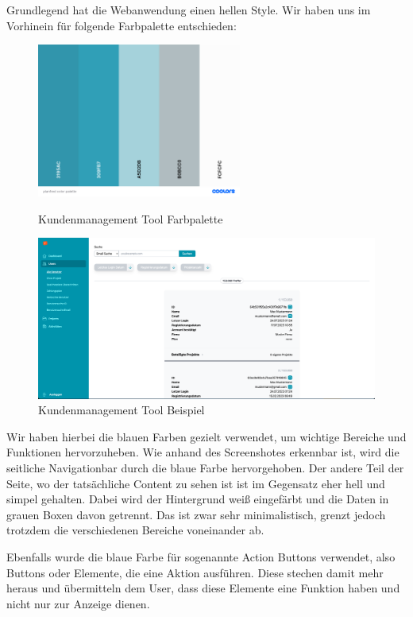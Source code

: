 Grundlegend hat die Webanwendung einen hellen Style. Wir haben uns im Vorhinein für folgende Farbpalette entschieden:

\begin{figure}[h!]
    \centering
    \includegraphics[width=0.6\textwidth]{pics/planfred-color-palette.png}
    \caption{Kundenmanagement Tool Farbpalette}
    \cite{frontend_design_colors}
    \label{fig:mesh1}
\end{figure}
\newpage
\begin{figure}[h!]
    \centering
    \includegraphics[width=1\textwidth]{pics/planfred-ui-ux-example.png}
    \caption{Kundenmanagement Tool Beispiel}
    \label{fig:mesh1}
\end{figure}

Wir haben hierbei die blauen Farben gezielt verwendet, um wichtige Bereiche und Funktionen hervorzuheben. Wie anhand des Screenshotes erkennbar ist, wird die seitliche Navigationbar durch die blaue Farbe hervorgehoben. Der andere Teil der Seite, wo der tatsächliche Content zu sehen ist ist im Gegensatz eher hell und simpel gehalten. Dabei wird der Hintergrund weiß eingefärbt und die Daten in grauen Boxen davon getrennt. Das ist zwar sehr minimalistisch, grenzt jedoch trotzdem die verschiedenen Bereiche voneinander ab.

Ebenfalls wurde die blaue Farbe für sogenannte Action Buttons verwendet, also Buttons oder Elemente, die eine Aktion ausführen. Diese stechen damit mehr heraus und übermitteln dem User, dass diese Elemente eine Funktion haben und nicht nur zur Anzeige dienen.

